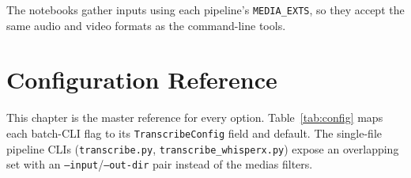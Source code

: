 \documentclass[11pt,a4paper]{report}
\newcommand{\code}[1]{\texttt{\small #1}}
\begin{document}
The notebooks gather inputs using each pipeline's \code{MEDIA\_EXTS}, so they
accept the same audio and video formats as the command-line tools.

\chapter{Configuration Reference}
\label{ch:configref}

This chapter is the master reference for every option. Table~\ref{tab:config}
maps each batch-CLI flag to its \code{TranscribeConfig} field and default. The
single-file pipeline CLIs (\texttt{transcribe.py}, \texttt{transcribe\_whisperx.py})
expose an overlapping set with an \code{--input}/\code{--out-dir} pair instead of
the medias filters.
\end{document}

